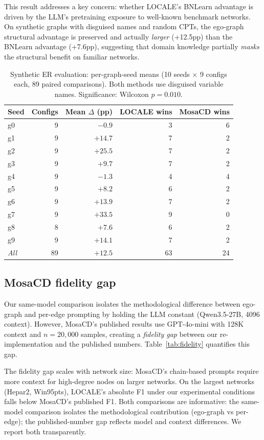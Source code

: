 \documentclass{article}
\begin{document}
This result addresses a key concern: whether LOCALE's BNLearn advantage is driven by the LLM's pretraining exposure to well-known benchmark networks. On synthetic graphs with disguised names and random CPTs, the ego-graph structural advantage is preserved and actually \textit{larger} (+12.5pp) than the BNLearn advantage (+7.6pp), suggesting that domain knowledge partially \textit{masks} the structural benefit on familiar networks.

\begin{table}[t]
\centering
\caption{Synthetic ER evaluation: per-graph-seed means (10 seeds $\times$ 9 configs each, 89 paired comparisons). Both methods use disguised variable names. Significance: Wilcoxon $p{=}0.010$.}
\label{tab:synthetic}
\small
\begin{tabular}{lrrrr}
\toprule
Seed & Configs & Mean $\Delta$ (pp) & LOCALE wins & MosaCD wins \\
\midrule
g0 & 9 & $-0.9$ & 3 & 6 \\
g1 & 9 & $+14.7$ & 7 & 2 \\
g2 & 9 & $+25.5$ & 7 & 2 \\
g3 & 9 & $+9.7$  & 7 & 2 \\
g4 & 9 & $-1.3$  & 4 & 4 \\
g5 & 9 & $+8.2$  & 6 & 2 \\
g6 & 9 & $+13.9$ & 7 & 2 \\
g7 & 9 & $+33.5$ & 9 & 0 \\
g8 & 8 & $+7.6$  & 6 & 2 \\
g9 & 9 & $+14.1$ & 7 & 2 \\
\midrule
\textit{All} & 89 & $+12.5$ & 63 & 24 \\
\bottomrule
\end{tabular}
\end{table}

\subsection{MosaCD fidelity gap}
\label{sec:fidelity}

Our same-model comparison isolates the methodological difference between ego-graph and per-edge prompting by holding the LLM constant (Qwen3.5-27B, 4096 context). However, MosaCD's published results use GPT-4o-mini with 128K context and $n{=}20{,}000$ samples, creating a \textit{fidelity gap} between our re-implementation and the published numbers. Table~\ref{tab:fidelity} quantifies this gap.

The fidelity gap scales with network size: MosaCD's chain-based prompts require more context for high-degree nodes on larger networks. On the largest networks (Hepar2, Win95pts), LOCALE's absolute F1 under our experimental conditions falls below MosaCD's published F1. Both comparisons are informative: the same-model comparison isolates the methodological contribution (ego-graph vs per-edge); the published-number gap reflects model and context differences. We report both transparently.
\end{document}
